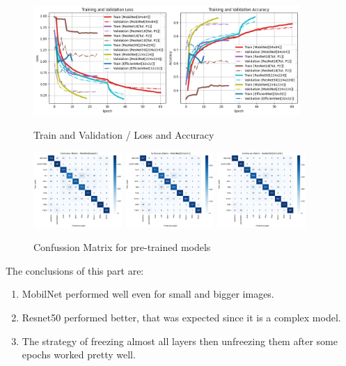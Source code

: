 \documentclass{cpsc202}
\begin{document}
    \begin{figure}[h]
        \caption{Train and Validation / Loss and Accuracy}
        \centering
        \includegraphics[width=0.9\textwidth]{training_metrics_pretrained_01}
        \label{fig:training_metrics_pretrained_01}
    \end{figure}
    \begin{figure}[h]
        \caption{Confussion Matrix for pre-trained models}
        \centering
        \includegraphics[width=0.3\textwidth]{confusion_matrix_mobilnet64}
        \includegraphics[width=0.3\textwidth]{confusion_matrix_mobilnet224}
        \includegraphics[width=0.3\textwidth]{confusion_matrix_resnet50}
        \label{fig:confussion_matrix_pretrained}
    \end{figure}

    The conclusions of this part are:
    \begin{enumerate}
        \item MobilNet performed well even for small and bigger images.
        \item Resnet50 performed better, that was expected since it is a complex model.
        \item The strategy of freezing almost all layers then unfreezing them after some epochs worked pretty well.
    \end{enumerate}
\end{document}
